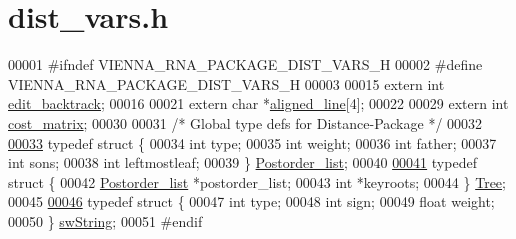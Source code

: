 \hypertarget{dist__vars_8h_source}{\section{dist\+\_\+vars.\+h}
\label{dist__vars_8h_source}
}

\begin{DoxyCode}
00001 \textcolor{preprocessor}{#ifndef VIENNA\_RNA\_PACKAGE\_DIST\_VARS\_H}
00002 \textcolor{preprocessor}{#define VIENNA\_RNA\_PACKAGE\_DIST\_VARS\_H}
00003 
00015 \textcolor{keyword}{extern} \textcolor{keywordtype}{int}   \hyperlink{dist__vars_8h_aa03194c513af6b860e7b33e370b82bdb}{edit\_backtrack};
00016 
00021 \textcolor{keyword}{extern} \textcolor{keywordtype}{char} *\hyperlink{dist__vars_8h_ac1605fe3448ad0a0b809c4fb8f6a854a}{aligned\_line}[4];
00022 
00029 \textcolor{keyword}{extern} \textcolor{keywordtype}{int}  \hyperlink{dist__vars_8h_ab65d8ff14c6937612212526a60f59b3c}{cost\_matrix};
00030 
00031 \textcolor{comment}{/*  Global type defs for Distance-Package */}
00032 
\hypertarget{dist__vars_8h_source_l00033}{}\hyperlink{structPostorder__list}{00033} \textcolor{keyword}{typedef} \textcolor{keyword}{struct }\{
00034                  \textcolor{keywordtype}{int}  type;
00035                  \textcolor{keywordtype}{int}  weight;
00036                  \textcolor{keywordtype}{int}  father;
00037                  \textcolor{keywordtype}{int}  sons;
00038                  \textcolor{keywordtype}{int}  leftmostleaf;
00039                \} \hyperlink{structPostorder__list}{Postorder\_list};
00040 
\hypertarget{dist__vars_8h_source_l00041}{}\hyperlink{structTree}{00041} \textcolor{keyword}{typedef} \textcolor{keyword}{struct }\{
00042                  \hyperlink{structPostorder__list}{Postorder\_list} *postorder\_list;
00043                  \textcolor{keywordtype}{int}            *keyroots;
00044                \} \hyperlink{structTree}{Tree};
00045 
\hypertarget{dist__vars_8h_source_l00046}{}\hyperlink{structswString}{00046} \textcolor{keyword}{typedef} \textcolor{keyword}{struct }\{
00047                  \textcolor{keywordtype}{int}    type;
00048                  \textcolor{keywordtype}{int}    sign;
00049                  \textcolor{keywordtype}{float}  weight;
00050                \} \hyperlink{structswString}{swString};
00051 \textcolor{preprocessor}{#endif}
\end{DoxyCode}
